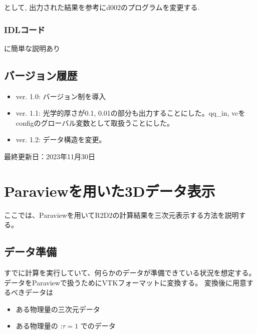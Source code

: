 \documentclass[letterpaper,10pt,dvipdfmx,report]{sphinxmanual}
\begin{document}
\begin{sphinxVerbatim}[commandchars=\\\{\}]
  
\end{sphinxVerbatim}

\sphinxAtStartPar
として, 出力された結果を参考にd002のプログラムを変更する.


\subsection{IDLコード}
\label{\detokenize{io:idl}}
\sphinxAtStartPar
{} に簡単な説明あり


\section{バージョン履歴}
\label{\detokenize{io:id8}}\begin{itemize}
\item {} 
\sphinxAtStartPar
ver. 1.0: バージョン制を導入

\item {} 
\sphinxAtStartPar
ver. 1.1: 光学的厚さが0.1, 0.01の部分も出力することにした。qq\_in, vcをconfigのグローバル変数として取扱うことにした。

\item {} 
\sphinxAtStartPar
ver. 1.2: データ構造を変更。

\end{itemize}

\sphinxAtStartPar
最終更新日：2023年11月30日

\sphinxstepscope


\chapter{Paraviewを用いた3Dデータ表示}
\label{\detokenize{paraview:paraview3d}}\label{\detokenize{paraview::doc}}
\sphinxAtStartPar
ここでは、Paraviewを用いてR2D2の計算結果を三次元表示する方法を説明する。


\section{データ準備}
\label{\detokenize{paraview:id1}}
\sphinxAtStartPar
すでに計算を実行していて、何らかのデータが準備できている状況を想定する。
データをParaviewで扱うためにVTKフォーマットに変換する。
変換後に用意するべきデータは
\begin{itemize}
\item {} 
\sphinxAtStartPar
ある物理量の三次元データ

\item {} 
\sphinxAtStartPar
ある物理量の :\(\tau=1\) でのデータ

\end{itemize}
\end{document}
